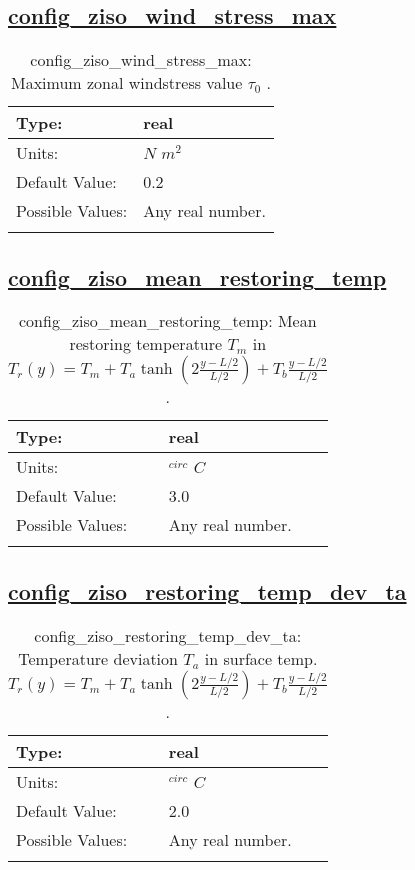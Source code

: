 \subsection[config\_ziso\_wind\_stress\_max]{\hyperref[sec:nm_tab_ziso]{config\_ziso\_wind\_stress\_max}}
\label{subsec:nm_sec_config_ziso_wind_stress_max}
\begin{center}
\begin{longtable}{| p{2.0in} || p{4.0in} |}
    \hline
    Type: & real \\
    \hline
    Units: & $N$ $m^{2}$ \\
    \hline
    Default Value: & 0.2 \\
    \hline
    Possible Values: & Any real number. \\
    \hline
    \caption{config\_ziso\_wind\_stress\_max:  Maximum zonal windstress value  $\tau_0$ .}
\end{longtable}
\end{center}
\subsection[config\_ziso\_mean\_restoring\_temp]{\hyperref[sec:nm_tab_ziso]{config\_ziso\_mean\_restoring\_temp}}
\label{subsec:nm_sec_config_ziso_mean_restoring_temp}
\begin{center}
\begin{longtable}{| p{2.0in} || p{4.0in} |}
    \hline
    Type: & real \\
    \hline
    Units: & $^{circ}$ $C$ \\
    \hline
    Default Value: & 3.0 \\
    \hline
    Possible Values: & Any real number. \\
    \hline
    \caption{config\_ziso\_mean\_restoring\_temp:  Mean restoring temperature  $T_m$  in  $T_r(y) = T_m + T_a \tanh\left(2\frac{y-L/2}{L/2}\right) + T_b \frac{y-L/2}{L/2}$ .}
\end{longtable}
\end{center}
\subsection[config\_ziso\_restoring\_temp\_dev\_ta]{\hyperref[sec:nm_tab_ziso]{config\_ziso\_restoring\_temp\_dev\_ta}}
\label{subsec:nm_sec_config_ziso_restoring_temp_dev_ta}
\begin{center}
\begin{longtable}{| p{2.0in} || p{4.0in} |}
    \hline
    Type: & real \\
    \hline
    Units: & $^{circ}$ $C$ \\
    \hline
    Default Value: & 2.0 \\
    \hline
    Possible Values: & Any real number. \\
    \hline
    \caption{config\_ziso\_restoring\_temp\_dev\_ta:  Temperature deviation  $T_a$  in surface temp.  $T_r(y) = T_m + T_a \tanh\left(2\frac{y-L/2}{L/2}\right) + T_b \frac{y-L/2}{L/2}$ .}
\end{longtable}
\end{center}

